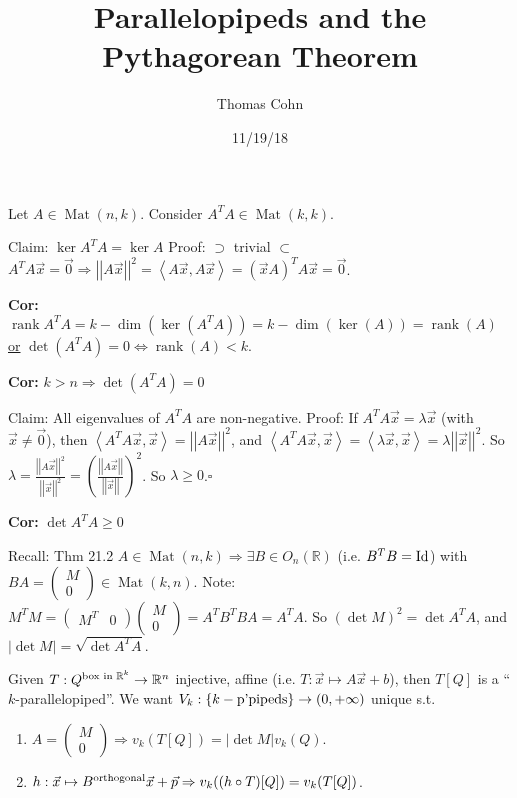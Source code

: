 \documentclass[10pt,letterpaper]{article}
\author{Thomas Cohn}
\title{Parallelopipeds and the Pythagorean Theorem}
\date{11/19/18} %
\newcommand{\n}{\hfill\break}
\newcommand{\cor}[1]{\par\noindent\settowidth{\hangindent}{\textbf{Cor: }}\textbf{Cor: }#1\n}
\newcommand{\proven}{\;$\square$\n}
\newcommand{\ptxt}[1]{\textrm{\textnormal{#1}}}
\newcommand{\set}[1]{\left\{#1\right\}}
\newcommand{\reals}{\mathbb{R}}
\newcommand{\R}{\reals}
\newcommand{\abs}[1]{\left|#1\right|}
\newcommand{\of}{\circ}
\newcommand{\Id}{\textrm{\textnormal{Id}}}
\newcommand{\norm}[1]{\abs{\abs{#1}}}
\newcommand{\tpose}{^{T}}
\newcommand{\iprod}[1]{\left<#1\right>}
\DeclareMathOperator{\Mat}{Mat}
\DeclareMathOperator{\rank}{rank}
\newcommand{\st}{s.t.}
\newcommand{\paren}[1]{\left(#1\right)}
\begin{document}
\maketitle
\setlength\RaggedRightParindent{\parindent}
\RaggedRight

\par\noindent Let $A\in\Mat(n,k)$. Consider $A\tpose{}A\in\Mat(k,k)$.\n

\par\noindent Claim: $\ker{}A\tpose{}A=\ker{}A$\n
Proof: $\supset$ trivial\n
\phantom{Proof: }$\subset$ $A\tpose{}A\vec{x}=\vec{0}\Rightarrow\norm{A\vec{x}}^{2}=\iprod{A\vec{x},A\vec{x}}=(\vec{x}A)\tpose{}A\vec{x}=\vec{0}$.

\cor{$\rank{}A\tpose{}A=k-\dim(\ker(A\tpose{}A))=k-\dim(\ker(A))=\rank(A)$\n
\underline{or} $\det(A\tpose{}A)=0\Leftrightarrow\rank(A)<k$.}

\cor{$k>n\Rightarrow\det(A\tpose{}A)=0$}

\par\noindent Claim: All eigenvalues of $A\tpose{}A$ are non-negative.\n
Proof: If $A\tpose{}A\vec{x}=\lambda\vec{x}$ (with $\vec{x}\ne\vec{0}$), then $\iprod{A\tpose{}A\vec{x},\vec{x}}=\norm{A\vec{x}}^{2}$, and $\iprod{A\tpose{}A\vec{x},\vec{x}}=\iprod{\lambda\vec{x},\vec{x}}=\lambda\norm{\vec{x}}^{2}$.\n
So $\lambda=\frac{\norm{A\vec{x}}^{2}}{\norm{\vec{x}}^{2}}=\paren{\frac{\norm{A\vec{x}}}{\norm{\vec{x}}}}^{2}$. So $\lambda\ge{}0$.\proven

\cor{$\det{}A\tpose{}A\ge{}0$}

\par\noindent Recall: Thm 21.2 $A\in\Mat(n,k)\Rightarrow\exists{}B\in{}O_{n}(\R)$ (i.e. $B\tpose{}B=\Id$) with $BA=\paren{\begin{array}{c}M\\ 0\end{array}}\in\Mat(k,n)$.\n
Note: $M\tpose{}M=\paren{\begin{array}{cc}M\tpose & 0\end{array}}\paren{\begin{array}{c}M\\ 0\end{array}}=A\tpose{}B\tpose{}BA=A\tpose{}A$.\n
So $(\det{}M)^{2}=\det{}A\tpose{}A$, and $\abs{\det{}M}=\sqrt{\det{}A\tpose{}A}$.\n

\par\noindent Given $T:Q^{\ptxt{box in }\R^{k}}\to\R^{n}$ injective, affine (i.e. $T:\vec{x}\mapsto{}A\vec{x}+b$), then $T[Q]$ is a ``$k$-parallelopiped''.\n
We want $V_{k}:\set{k-\ptxt{p'pipeds}}\to(0,+\infty)$ unique \st{}
\begin{enumerate}[label=(\arabic*)]
	\item $A=\paren{\begin{array}{c}M\\ 0\end{array}}\Rightarrow{}v_{k}(T[Q])=\abs{\det{M}}v_{k}(Q)$.
	\item $h:\vec{x}\mapsto{}B^{\ptxt{orthogonal}}\vec{x}+\vec{p}\Rightarrow{}v_{k}((h\of{}T)[Q])=v_{k}(T[Q])$.
\end{enumerate}
\end{document}
